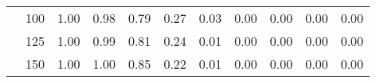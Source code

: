 \begin{table}[t]
\begin{center}
\begin{subtable}[c]{\textwidth}
\begin{center}
\begin{tabular}{rcccccccccc}
                                        & \multicolumn{1}{c|}{100}  & \num{1.00}  & \num{0.98}  & \num{0.79}  & \num{0.27}  & \num{0.03}  & \num{0.00}  & \num{0.00}  & \num{0.00}  & \num{0.00}  \\
                                        & \multicolumn{1}{c|}{125}  & \num{1.00}  & \num{0.99}  & \num{0.81}  & \num{0.24}  & \num{0.01}  & \num{0.00}  & \num{0.00}  & \num{0.00}  & \num{0.00}  \\
                                        & \multicolumn{1}{c|}{150}  & \num{1.00}  & \num{1.00}  & \num{0.85}  & \num{0.22}  & \num{0.01}  & \num{0.00}  & \num{0.00}  & \num{0.00}  & \num{0.00}  \\
                                    \end{tabular}
            \end{center}
        \end{subtable}

        \vspace{5mm}


\end{center}
\end{table}
